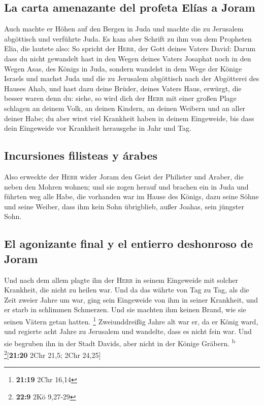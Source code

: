 \hypertarget{la-carta-amenazante-del-profeta-eluxedas-a-joram}{%
\subsection{La carta amenazante del profeta Elías a
Joram}\label{la-carta-amenazante-del-profeta-eluxedas-a-joram}}

 Auch machte er Höhen auf den Bergen in Juda und machte
die zu Jerusalem abgöttisch und verführte Juda.  Es kam
aber Schrift zu ihm von dem Propheten Elia, die lautete also: So spricht
der \textsc{Herr}, der Gott deines Vaters David: Darum dass du nicht
gewandelt hast in den Wegen deines Vaters Josaphat noch in den Wegen
Asas, des Königs in Juda,  sondern wandelst in dem Wege
der Könige Israels und machst Juda und die zu Jerusalem abgöttisch nach
der Abgötterei des Hauses Ahab, und hast dazu deine Brüder, deines
Vaters Haus, erwürgt, die besser waren denn du:  siehe,
so wird dich der \textsc{Herr} mit einer großen Plage schlagen an deinem
Volk, an deinen Kindern, an deinen Weibern und an aller deiner Habe;
 du aber wirst viel Krankheit haben in deinem Eingeweide,
bis dass dein Eingeweide vor Krankheit herausgehe in Jahr und Tag.

\hypertarget{incursiones-filisteas-y-uxe1rabes}{%
\subsection{Incursiones filisteas y
árabes}\label{incursiones-filisteas-y-uxe1rabes}}

 Also erweckte der \textsc{Herr} wider Joram den Geist
der Philister und Araber, die neben den Mohren wohnen; 
und sie zogen herauf und brachen ein in Juda und führten weg alle Habe,
die vorhanden war im Hause des Königs, dazu seine Söhne und seine
Weiber, dass ihm kein Sohn übrigblieb, außer Joahas, sein jüngster Sohn.

\hypertarget{el-agonizante-final-y-el-entierro-deshonroso-de-joram}{%
\subsection{El agonizante final y el entierro deshonroso de
Joram}\label{el-agonizante-final-y-el-entierro-deshonroso-de-joram}}

 Und nach dem allem plagte ihn der \textsc{Herr} in
seinem Eingeweide mit solcher Krankheit, die nicht zu heilen war.
 Und da das währte von Tag zu Tag, als die Zeit zweier
Jahre um war, ging sein Eingeweide von ihm in seiner Krankheit, und er
starb in schlimmen Schmerzen. Und sie machten ihm keinen Brand, wie sie
seinen Vätern getan hatten. \footnote{\textbf{21:19} 2Chr 16,14}
 Zweiunddreißig Jahre alt war er, da er König ward, und
regierte acht Jahre zu Jerusalem und wandelte, dass es nicht fein war.
Und sie begruben ihn in der Stadt Davids, aber nicht in der Könige
Gräbern. \textsuperscript{b} \footnote{\textbf{22:9} 2Kö 9,27-29}{[}\textbf{21:20}
2Chr 21,5; 2Chr 24,25{]}

